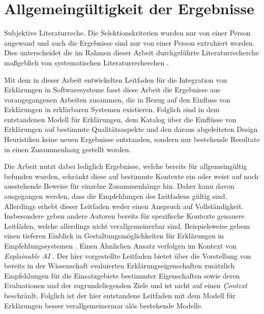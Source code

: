 \section{Allgemeingültigkeit der Ergebnisse}



Subjektive Literaturreche. Die Selektionskriterien wurden nur von einer Person angewand und auch die Ergebnisse sind nur von einer Person extrahiert worden. Dies unterscheidet die im Rahmen dieser Arbeit durchgeführte Literaturrecherche maßgeblich von systematischen Literaturrecherchen \cite[vgl.][]{nunes_systematic_2017,chazette_knowledge_nodate}.

Mit dem in dieser Arbeit entwickelten Leitfaden für die Integration von Erklärungen in Softwaresysteme fasst diese Arbeit die Ergebnisse aus vorangegangenen Arbeiten zusammen, die in Bezug auf den Einfluss von Erklärungen in erklärbaren Systemen existieren. Folglich sind in dem entstandenen Modell für Erklärungen, dem Katalog über die Einflüsse von Erklärungen auf bestimmte Qualitätsaspekte und den daraus abgeleiteten Design Heuristiken keine neuen Ergebnisse entstanden, sondern nur bestehende Resultate in einen Zusammenhang gestellt worden.

Die Arbeit nutzt dabei lediglich Ergebnisse, welche bereits für allgemeingültig befunden wurden, schränkt diese auf bestimmte Kontexte ein oder weist auf noch ausstehende Beweise für einzelne Zusammenhänge hin. Daher kann davon ausgegangen werden, dass die Empfehlungen des Leitfadens gültig sind. Allerdings erhebt dieser Leitfaden weder einen Anspruch auf Vollständigkeit. Insbesondere geben andere Autoren bereits für spezifische Kontexte genauere Leitfäden, welche allerdings nicht verallgemeinerbar sind. Beispielsweise gebem \citeauthor{nunes_systematic_2017} einen tieferen Einblick in Gestaltungsmöglichkeiten für Erklärungen in Empfehlungssystemen \cite{nunes_systematic_2017}. Einen Ähnlichen Ansatz verfolgen \citeauthor{sokol_explainability_2020} im Kontext von \textit{Explainable AI} \cite{sokol_explainability_2020}. Der hier vorgestellte Leitfaden bietet über die Vorstellung von bereits in der Wissenschaft evaluierten Erklärungseigenschaften zusätzlich Empfehlungen für die Einsatzgebiete bestimmter Eigenschaften sowie deren Evaluationen und der zugrundeliegenden Ziele und ist nicht auf einen \textit{Çontext} beschränlt. Folglich ist der hier entstandene Leitfaden mit dem Modell für Erklärungen besser verallgemeinermar alös bestehende Modelle.

